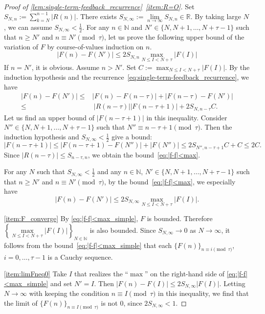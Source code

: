 \documentclass[a4paper,UKenglish,cleveref,autoref,thm-restate]{lipics-v2021}
\newcommand{\R}{\mathbb{R}}
\newcommand{\N}{\mathbb{N}}
\begin{document}
\begin{proof}[Proof of \cref{lem:single-term-feedback_recurrence}~\eqref{item:R=O}]
Set $S_{N, n} := \sum_{k=N}^{n-1} |R(n)|$. There exists $S_{N, \infty} := \lim\limits_{n \to \infty} S_{N, n} \in \R$. By taking large $N$, we can assume $S_{N, \infty} < \frac12$. 
For any $n \in \N$ and $N' \in \{ N, N+1, \dots, N+\tau-1 \}$ such that $n \geq N'$ and $n \equiv N' \pmod{\tau}$, let us prove the following upper bound of the variation of $F$ by course-of-values induction on $n$. 
\begin{equation} \label{eq:|f-f|<max}
\left| F(n) - F (N') \right| 
\leq
2 S_{N, n} \max_{N \leq I < N + \tau} \left| F (I) \right|
\end{equation}
If $n = N'$, it is obvious. Assume $n > N'$. Set $\displaystyle C := \max_{N \leq I < N + \tau} \left| F (I) \right|$. By the induction hypothesis and the recurrence~\eqref{eq:single-term-feedback_recurrence}, we have
\[
\begin{aligned}
\left| F(n) - F (N') \right| 
\leq&
\left| F(n) - F(n-\tau) \right|  + \left| F(n-\tau) - F(N') \right| \\
\leq&\ 
| R(n-\tau) | \left| F(n-\tau+1) \right| + 
2 S_{N, n-\tau} C.
\end{aligned}
\]
Let us find an upper bound of $\left| F(n-\tau+1) \right|$ in this inequality. Consider $N'' \in \{ N, N+1, \dots, N+\tau-1\}$ such that $N'' \equiv n-\tau+1 \pmod{\tau}$. Then the induction hypothesis and $S_{N, \infty} < \frac12$ give a bound:
\[
\left| F (n-\tau+1) \right| 
\leq
\left| F (n-\tau+1) - F (N'') \right| + \left| F (N'') \right| 
\leq 
2 S_{N'', n-\tau+1} C + C
\leq 2C. 
\]
Since $|R(n-\tau)| \leq S_{n-\tau, n}$, we obtain the bound~\eqref{eq:|f-f|<max}. 

For any $N$ such that $S_{N, \infty} < \frac12$ and any $n \in \N$, $N' \in \{ N, N+1, \dots, N+\tau-1 \}$ such that $n \geq N'$ and $n \equiv N' \pmod{\tau}$, by the bound~\eqref{eq:|f-f|<max}, we especially have 
\begin{equation} \label{eq:|f-f|<max_simple}
|F(n) - F(N')| 
\leq 
2 S_{N, \infty} \max_{N \leq I < N+\tau} |F(I)|. 
\end{equation}

\eqref{item:F_converge} By \eqref{eq:|f-f|<max_simple}, $F$ is bounded. Therefore $\left\{ \max\limits_{N \leq I < N+\tau} |F(I)| \right\}_{N \in \N}$ is also bounded. Since $S_{N, \infty} \to 0$ as $N\to \infty$, it follows from the bound~\eqref{eq:|f-f|<max_simple} that each $\{ F(n)\}_{n \equiv i \pmod{\tau}}$, $i=0, \dots, \tau-1 $ is a Cauchy sequence.

\eqref{item:limFneq0} Take $I$ that realizes the ``$\max$'' on the right-hand side of \eqref{eq:|f-f|<max_simple} and set $N' = I$. Then $|F(n) - F(I)| \leq 2 S_{N, \infty} |F(I)|$. Letting $N \to \infty$ with keeping the condition $n \equiv I \pmod{\tau}$ in this inequality, we find that the limit of $\{ F(n) \}_{n \equiv I \pmod{\tau}}$ is not $0$, since $2 S_{N, \infty} < 1$. 
\end{proof}
\end{document}
